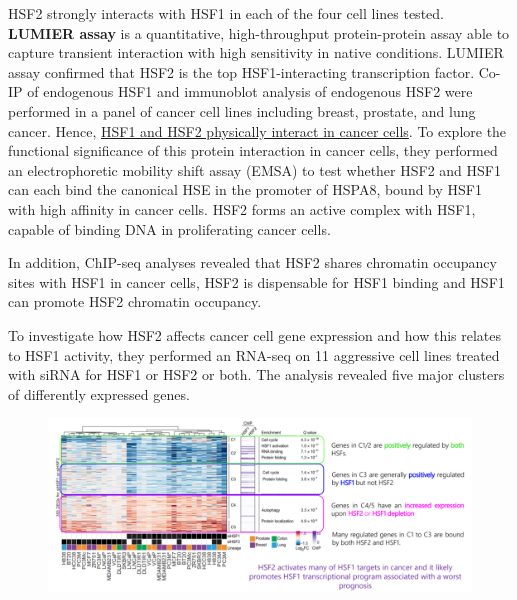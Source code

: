 HSF2 strongly interacts with HSF1 in each of the four cell lines tested. \textbf{LUMIER assay} is a quantitative, high-throughput protein-protein assay able to capture transient interaction with high sensitivity in native conditions. LUMIER assay confirmed that HSF2 is the top HSF1-interacting transcription factor. Co-IP of endogenous HSF1 and immunoblot analysis of endogenous HSF2 were performed in a panel of cancer cell lines including breast, prostate, and lung cancer. Hence, \underline{HSF1 and HSF2 physically interact in cancer cells}. To explore the functional significance of this protein interaction in cancer cells, they performed an electrophoretic mobility shift assay (EMSA) to test whether HSF2 and HSF1 can each bind the canonical HSE in the promoter of HSPA8, bound by HSF1 with high affinity in cancer cells. HSF2 forms an active complex with HSF1, capable of binding DNA in proliferating cancer cells.

In addition, ChIP-seq analyses revealed that HSF2 shares chromatin occupancy sites with HSF1 in cancer cells, HSF2 is dispensable for HSF1 binding and HSF1 can promote HSF2 chromatin occupancy.

To investigate how HSF2 affects cancer cell gene expression and how this relates to HSF1 activity, they performed an RNA-seq on 11 aggressive
cell lines treated with siRNA for HSF1 or HSF2 or both. The analysis revealed five major clusters of differently expressed genes.


\begin{figure}
\centering
\includegraphics[width=\textwidth]{../_resources/Screen_Shot_2022-12-20_at_11-45-23.png}
\caption{}
\end{figure}

